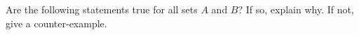 \documentclass[11pt]{exam}
\begin{document}
\begin{questions}
\begin{multicols}{3}
\end{multicols}

\vfill

\question Are the following statements true for all sets $A$ and $B$?  If so, explain why.  If not, give a counter-example.


\end{questions}
\newpage
\end{document}
